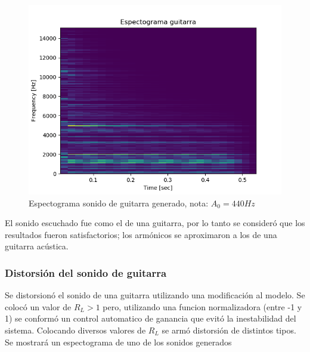 \documentclass[assd_tp2_main.tex]{subfiles}
\begin{document}
\begin{figure}[H]
	\begin{center}
	\includegraphics[scale=0.5]{graficos/espectograma_guitarra.png}
	\caption{Espectograma sonido de guitarra generado, nota: $A_0=440 Hz$}

	\end{center}
\end{figure}
El sonido escuchado fue como el de una guitarra, por lo tanto se consider\'o que los resultados fueron satisfactorios; los armónicos se aproximaron a los de una guitarra acústica.


\subsubsection{Distorsión del sonido de guitarra}
Se distorsionó el sonido de una guitarra utilizando una modificación al modelo. Se colocó un valor de $R_L>1$ pero, utilizando una funcion normalizadora (entre -1 y 1) se conformó un control automatico de ganancia que evitó la inestabilidad del sistema. Colocando diversos valores de $R_L$ se armó distorsión de distintos tipos. 
Se mostrará un espectograma de uno de los sonidos generados
\end{document}
